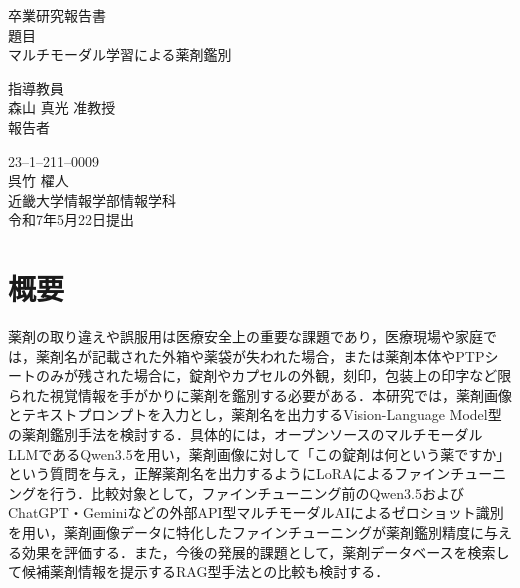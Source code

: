 \documentclass{ltjsarticle}
\begin{document}
\pagestyle{empty}

\begin{center}
\vspace*{1cm}
\large
{\LARGE 卒業研究報告書}\\
\vspace*{0.8cm}
題目\\
\vspace*{1cm}
{\Huge {マルチモーダル学習による薬剤鑑別}}\\
\vspace{3mm}

\vspace*{3cm}
指導教員\\
\vspace*{0.3cm}
{\LARGE 森山 真光  准教授}\\
\vspace*{3cm}
報告者\\
\vspace*{0.3cm}

{23--1--211--0009}\\
\vspace*{0.3cm}
{\Huge 呉竹 櫂人}\\
\vspace*{0.5cm}
近畿大学情報学部情報学科\\
\vspace*{2cm}
令和7年5月22日提出\\
\end{center}

\newpage
\normalsize

\clearpage
\section*{概要}

薬剤の取り違えや誤服用は医療安全上の重要な課題であり，医療現場や家庭では，薬剤名が記載された外箱や薬袋が失われた場合，または薬剤本体やPTPシートのみが残された場合に，錠剤やカプセルの外観，刻印，包装上の印字など限られた視覚情報を手がかりに薬剤を鑑別する必要がある．本研究では，薬剤画像とテキストプロンプトを入力とし，薬剤名を出力するVision-Language Model型の薬剤鑑別手法を検討する．具体的には，オープンソースのマルチモーダルLLMであるQwen3.5を用い，薬剤画像に対して「この錠剤は何という薬ですか」という質問を与え，正解薬剤名を出力するようにLoRAによるファインチューニングを行う．比較対象として，ファインチューニング前のQwen3.5およびChatGPT・Geminiなどの外部API型マルチモーダルAIによるゼロショット識別を用い，薬剤画像データに特化したファインチューニングが薬剤鑑別精度に与える効果を評価する．また，今後の発展的課題として，薬剤データベースを検索して候補薬剤情報を提示するRAG型手法との比較も検討する．
\end{document}
